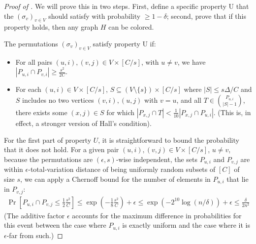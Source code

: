 \documentclass[10pt]{article}
\theoremstyle{definition}\newtheorem{definition}[lemma]{Definition}
\theoremstyle{remark}  \newtheorem*{remark}{Remark}
\begin{document}
\begin{proof}[Proof of ]
  We will prove this in two steps. First, define a specific property U 
  that the $(\sigma_v)_{v\in V}$ should satisfy with probability $\ge 1 - \delta$; second, prove that if this property holds, then any graph $H$ can be colored.
  
  The permutations $(\sigma_v)_{v\in V}$ satisfy property U if:
  \begin{itemize}
    \item For all pairs $(u,i),(v,j) \in V \times [C/s]$, with $u \ne v$, we have $|P_{u,i} \cap P_{v,i}| \ge \frac{s^2}{2 C}$.
    \item For each $(u,i) \in V \times [C/s]$, $S \subseteq (V \setminus \{s\}) \times [C/s]$ where $|S| \le s \Delta / C$ and $S$ includes no two vertices $(v,i),(u,j)$ with $v = u$, and all $T \in \binom{P_{u,i}}{|S| - 1}$, there exists some $(x,j) \in S$ for which $|P_{x,j} \cap T| < \frac{1}{10} |P_{x,j} \cap P_{u,i}|$. (This is, in effect, a stronger version of Hall's condition).
  \end{itemize}
  
  For the first part of property $U$, it is straightforward to bound the probability that it does not hold. For a given pair $(u,i),(v,j) \in V \times [C/s]$, $u\ne v$, because the permutations are $(\epsilon,s)$-wise independent, the sets $P_{u,i}$ and $P_{v,j}$ are within $\epsilon$-total-variation distance of being uniformly random subsets of $[C]$ of size $s$, we can apply a Chernoff bound for the number of elements in $P_{u,i}$ that lie in $P_{v,j}$:
  \begin{align}
    \Pr[ P_{u,i} \cap P_{v,j} \le \frac{1}{2} \frac{s^2}{C} ] \le \exp( -\frac{1}{8}  \frac{s^2}{C} ) + \epsilon \le \exp( - 2^{10} \log (n/\delta)) + \epsilon \le \frac{\delta}{2 n^2} \label{eq:puv-size-lb}
  \end{align}
  (The additive factor $\epsilon$ accounts for the maximum difference in probabilities for this event between the case where $P_{u,i}$ is exactly uniform and the case where it is $\epsilon$-far from such.)
  

\end{proof}
\end{document}
